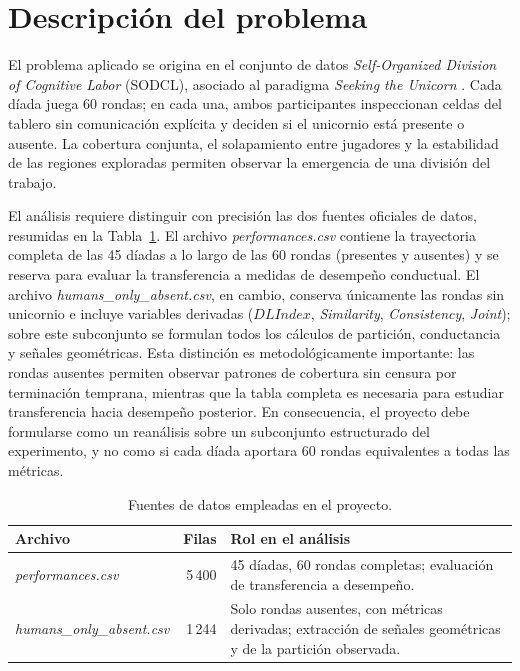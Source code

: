 \documentclass[journal]{IEEEtran}
\begin{document}
\section{Descripción del problema}

El problema aplicado se origina en el conjunto de datos \emph{Self-Organized Division of Cognitive Labor} (SODCL), asociado al paradigma \emph{Seeking the Unicorn} \cite{andrade2021}. Cada díada juega 60 rondas; en cada una, ambos participantes inspeccionan celdas del tablero sin comunicación explícita y deciden si el unicornio está presente o ausente. La cobertura conjunta, el solapamiento entre jugadores y la estabilidad de las regiones exploradas permiten observar la emergencia de una división del trabajo.

El análisis requiere distinguir con precisión las dos fuentes oficiales de datos, resumidas en la Tabla~\ref{tab:datasets}. El archivo \emph{performances.csv} contiene la trayectoria completa de las 45 díadas a lo largo de las 60 rondas (presentes y ausentes) y se reserva para evaluar la transferencia a medidas de desempeño conductual. El archivo \emph{humans\_only\_absent.csv}, en cambio, conserva únicamente las rondas sin unicornio e incluye variables derivadas ($DLIndex$, \emph{Similarity}, \emph{Consistency}, \emph{Joint}); sobre este subconjunto se formulan todos los cálculos de partición, conductancia y señales geométricas. Esta distinción es metodológicamente importante: las rondas ausentes permiten observar patrones de cobertura sin censura por terminación temprana, mientras que la tabla completa es necesaria para estudiar transferencia hacia desempeño posterior. En consecuencia, el proyecto debe formularse como un reanálisis sobre un subconjunto estructurado del experimento, y no como si cada díada aportara 60 rondas equivalentes a todas las métricas.

\begin{table}[t]
\centering
\caption{Fuentes de datos empleadas en el proyecto.}
\label{tab:datasets}
\begin{tabular}{@{}lrp{}@{}}
\toprule
\textbf{Archivo} & \textbf{Filas} & \textbf{Rol en el análisis} \\
\midrule
\emph{performances.csv} & 5\,400 & 45 díadas, 60 rondas completas; evaluación de transferencia a desempeño. \\
\addlinespace
\emph{humans\_only\_absent.csv} & 1\,244 & Solo rondas ausentes, con métricas derivadas; extracción de señales geométricas y de la partición observada. \\
\bottomrule
\end{tabular}
\end{table}
\end{document}
